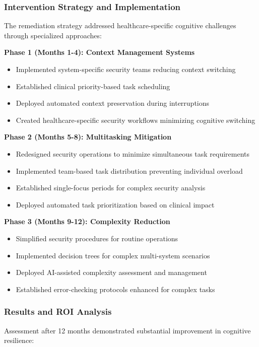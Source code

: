 \documentclass[11pt,a4paper]{article}
\begin{document}
\subsubsection{Intervention Strategy and Implementation}

The remediation strategy addressed healthcare-specific cognitive challenges through specialized approaches:

\textbf{Phase 1 (Months 1-4): Context Management Systems}
\begin{itemize}
\item Implemented system-specific security teams reducing context switching
\item Established clinical priority-based task scheduling
\item Deployed automated context preservation during interruptions
\item Created healthcare-specific security workflows minimizing cognitive switching
\end{itemize}

\textbf{Phase 2 (Months 5-8): Multitasking Mitigation}
\begin{itemize}
\item Redesigned security operations to minimize simultaneous task requirements
\item Implemented team-based task distribution preventing individual overload
\item Established single-focus periods for complex security analysis
\item Deployed automated task prioritization based on clinical impact
\end{itemize}

\textbf{Phase 3 (Months 9-12): Complexity Reduction}
\begin{itemize}
\item Simplified security procedures for routine operations
\item Implemented decision trees for complex multi-system scenarios
\item Deployed AI-assisted complexity assessment and management
\item Established error-checking protocols enhanced for complex tasks
\end{itemize}

\subsubsection{Results and ROI Analysis}

Assessment after 12 months demonstrated substantial improvement in cognitive resilience:
\end{document}
